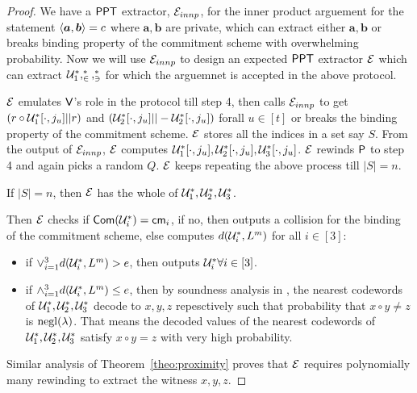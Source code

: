 \begin{proof}
	We have a $\mathsf{PPT}$ extractor, $\mathcal{E}_{innp}$, for the inner product arguement for the statement $\langle \bm{a},\bm{b}\rangle=c$ where $\bm{a},\bm{b}$ are private, which can extract either $\bm{a}, \bm{b}$ or breaks binding property of the commitment scheme with overwhelming probability. Now we will use $\mathcal{E}_{innp}$ to design an expected $\mathsf{PPT}$ extractor $\mathcal{E}$ which can extract $\mathcal{U}^*_1, \cal^*_2, \cal^*_3$ for which the arguemnet is accepted in the above protocol.
	
	$\mathcal{E}$ emulates $\mathsf{V}$'s role in the protocol till step 4, then calls $\mathcal{E}_{innp}$ to get $(r\circ \mathcal{U}^*_1[\cdot,j_u]||r)$ and $(\mathcal{U}^*_2[\cdot,j_u]||-\mathcal{U}^*_2[\cdot,j_u])$ forall $u\in [t]$ or breaks the binding property of the commitment scheme. $\mathcal{E}$ stores all the indices in a set say $S$. From the output of $\mathcal{E}_{innp}$, $\mathcal{E}$ computes $\mathcal{U}^*_1[\cdot,j_u], \mathcal{U}^*_2[\cdot,j_u],\mathcal{U}^*_3[\cdot,j_u]$. $\mathcal{E}$ rewinds $\mathsf{P}$ to step 4 and again picks a random $Q$. $\mathcal{E}$ keeps repeating the above process till $|S|=n$.
	
	If $|S|=n$, then $\mathcal{E}$ has the whole of $\mathcal{U}^*_1, \mathcal{U}^*_2, \mathcal{U}^*_3$.
	
	Then $\mathcal{E}$ checks if $\mathsf{Com}(\mathcal{U}^*_i)=\mathsf{cm}_i$, if no, then outputs a collision for the binding of the commitment scheme, else computes $d(\mathcal{U}^*_i, L^m)$ for all $i \in [3]$:
	
	\begin{itemize}
		\item if $\vee_{i=1}^{3} d(\mathcal{U}^*_i, L^m) > e$, then outputs $\mathcal{U}^*_i \forall i\in [3]$.
		
		\item if $\wedge_{i=1}^3 d(\mathcal{U}^*_i, L^m) \leq e$, then by soundness analysis in \cite{Ligero2017}, the nearest codewords of $\mathcal{U}^*_1, \mathcal{U}^*_2, \mathcal{U}^*_3$ decode to $x, y, z$ repesctively such that probability that $x \circ y \neq z$ is $\mathrm{negl}(\lambda)$. That means the decoded values of the nearest codewords of $\mathcal{U}^*_1, \mathcal{U}^*_2, \mathcal{U}^*_3$ satisfy $x\circ y = z$ with very high probability.
	\end{itemize}
	
	Similar analysis of Theorem~\ref{theo:proximity} proves that $\mathcal{E}$ requires polynomially many rewinding to extract the witness $x, y, z$.
\end{proof}

